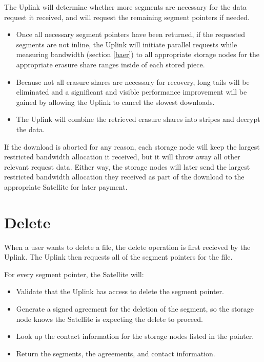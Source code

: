 \documentclass[8pt,fleqn,openany]{book}
\begin{document}
The Uplink will determine whether more segments are necessary for the
  data request it received, and will request the remaining segment pointers if needed.

\begin{itemize}
\item Once all necessary segment pointers have been returned, if the requested
  segments are not inline, the Uplink will initiate parallel requests
  while measuring bandwidth (section \ref{baer}) to all appropriate storage
  nodes for the appropriate erasure share ranges inside of each stored piece.
\item Because not all erasure shares are necessary for recovery, long tails
  will be eliminated and a significant and visible performance improvement will
  be gained by allowing the Uplink to cancel the slowest downloads.
\item The Uplink will combine the retrieved erasure shares into stripes and
  decrypt the data.
\end{itemize}

If the download is aborted for any reason, each storage node will keep the
  largest restricted bandwidth allocation it received, but it will throw away all
  other relevant request data.
Either way, the storage nodes will later send the largest restricted
  bandwidth allocation they received as part of the download to the appropriate
  Satellite for later payment.

\section{Delete}

When a user wants to delete a file, the delete operation is first recieved
by the Uplink. The Uplink then requests all of the segment pointers for the file.

For every segment pointer, the Satellite will:
  \begin{itemize}
  \item Validate that the Uplink has access to delete the segment pointer.
  \item Generate a signed agreement for the deletion of the segment, so the
    storage node knows the Satellite is expecting the delete to proceed.
  \item Look up the contact information for the storage nodes listed in the
  pointer.
  \item Return the segments, the agreements, and contact information.
  \end{itemize}
\end{document}
